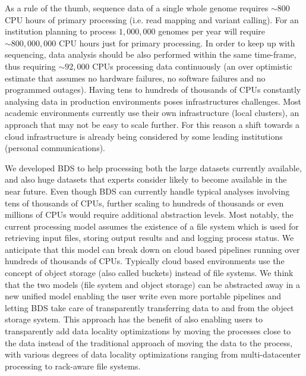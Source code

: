 As a rule of the thumb, sequence data of a single whole genome requires $\sim800$ CPU hours of primary processing (i.e. read mapping and variant calling).
For an institution planning to process $1,000,000$ genomes per year will require $\sim800,000,000$ CPU hours just for primary processing.
In order to keep up with sequencing, data analysis should be also performed within the same time-frame, thus requiring $\sim92,000$ CPUs processing data continuously (an over optimistic estimate that assumes no hardware failures, no software failures and no programmed outages).
Having tens to hundreds of thousands of CPUs constantly analysing data in production environments poses infrastructures challenges.
Most academic environments currently use their own infrastructure (local clusters), an approach that may not be easy to scale further.
For this reason a shift towards a cloud infrastructure is already being considered by some leading institutions (personal communications).

We developed BDS to help processing both the large datasets currently available, and also huge datasets that experts consider likely to become available in the near future.
Even though BDS can currently handle typical analyses involving tens of thousands of CPUs, further scaling to hundreds of thousands or even millions of CPUs would require additional abstraction levels.
Most notably, the current processing model assumes the existence of a file system which is used for retrieving input files, storing output results and and logging process status.
We anticipate that this model can break down on cloud based pipelines running over hundreds of thousands of CPUs.
Typically cloud based environments use the concept of object storage (also called buckets) instead of file systems.
We think that the two models (file system and object storage) can be abstracted away in a new unified model enabling the user write even more portable pipelines and letting BDS take care of transparently transferring data to and from the object storage system.
This approach has the benefit of also enabling users to transparently add data locality optimizations by moving the processes close to the data instead of the traditional approach of moving the data to the process, with various degrees of data locality optimizations ranging from multi-datacenter processing to rack-aware file systems.

